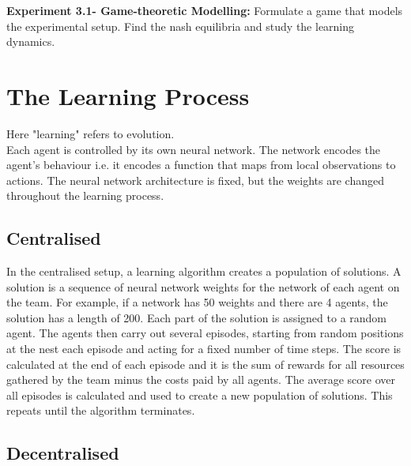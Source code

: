 \documentclass[12pt]{article}
\begin{document}
\textbf{Experiment 3.1- Game-theoretic Modelling:} Formulate a game that models the experimental setup. 
Find the nash equilibria and study the learning dynamics.\\




\appendix

\section{The Learning Process}\label{learning}

Here "learning" refers to evolution.\\

Each agent is controlled by its own neural network. 
The network encodes the agent’s behaviour i.e. it encodes a function that maps from local observations to actions. 
The neural network architecture is fixed, but the weights are changed throughout the learning process.\\

\subsection{Centralised}

In the centralised setup, a learning algorithm creates a population of solutions. 
A solution is a sequence of neural network weights for the network of each agent on the team. 
For example, if a network has 50 weights and there are 4 agents, the solution has a length of 200. 
Each part of the solution is assigned to a random agent. 
The agents then carry out several episodes, starting from random positions at the nest each episode and acting for a fixed number of time steps. 
The score is calculated at the end of each episode and it is the sum of rewards for all resources gathered by the team minus the costs paid by all agents. 
The average score over all episodes is calculated and used to create a new population of solutions. 
This repeats until the algorithm terminates.\\

\subsection{Decentralised}
\end{document}
